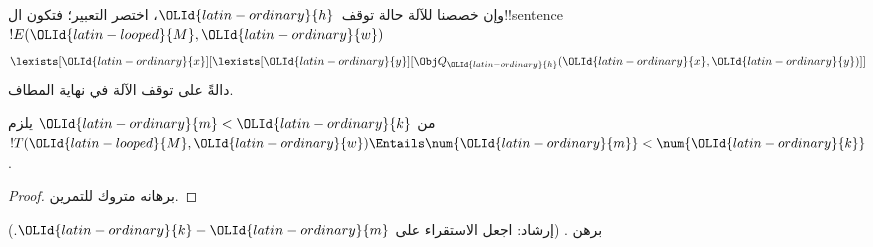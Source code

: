 \documentclass[../../../include/open-logic-section]{subfiles}
\begin{document}
وإن خصصنا للآلة حالة توقف~${\OLId{latin-ordinary}{h}}$، اختصر التعبير؛ فتكون
ال!!{sentence}~$!E({\OLId{latin-looped}{M}},{\OLId{latin-ordinary}{w}})$
\[
\lexists[{\OLId{latin-ordinary}{x}}][\lexists[{\OLId{latin-ordinary}{y}}][\Obj Q_{\OLId{latin-ordinary}{h}}({\OLId{latin-ordinary}{x}}, {\OLId{latin-ordinary}{y}})]]
\]
دالةً على توقف الآلة في نهاية المطاف.

\begin{prop}
من ${\OLId{latin-ordinary}{m}}<{\OLId{latin-ordinary}{k}}$ يلزم $!T({\OLId{latin-looped}{M}},{\OLId{latin-ordinary}{w}})\Entails\num{{\OLId{latin-ordinary}{m}}}<\num{{\OLId{latin-ordinary}{k}}}$.
\end{prop}

\begin{proof}
برهانه متروك للتمرين.
\end{proof}

\begin{prob}
برهن .
(إرشاد: اجعل الاستقراء على ${\OLId{latin-ordinary}{k}}-{\OLId{latin-ordinary}{m}}$.)
\end{prob}
\end{document}

